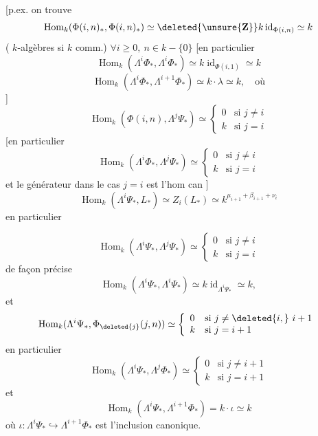 [p.ex. on trouve
\[
\operatorname{Hom}_k(\Phi(i,n)_*,\Phi(i,n)_*)
\simeq\deleted{\unsure{\mathbf Z}}k\operatorname{id}_{\Phi(i,n)}\simeq k
\]
(  
$k$-algèbres si $k$ comm.)
$\forall i\geq0,\ n\in k-\{0\}$
[en particulier
\[
\operatorname{Hom}_k(\Lambda^i\Phi_*,\Lambda^i\Phi_*)
\simeq k\operatorname{id}_{\Phi(i,1)}\simeq k
\]
\[
\operatorname{Hom}_k(\Lambda^i\Phi_*,\Lambda^{i+1}\Phi_*)
\simeq k\cdot\lambda\simeq k,\quad\text{où}
\]
]
\[
\operatorname{Hom}_k(\Phi(i,n),\Lambda^j\Psi_*)\simeq
\left\{\begin{array}{ll}0&\text{si }j\neq i\\k&\text{si }j=i\end{array}\right.
\]
[en particulier
\[
\operatorname{Hom}_k(\Lambda^i\Phi_*,\Lambda^j\Psi_*)\simeq
\left\{\begin{array}{ll}0&\text{si }j\neq i\\k&\text{si }j=i\end{array}\right.
\]
et le générateur dans le cas $j=i$ est
l'hom can
]
\[
\operatorname{Hom}_k(\Lambda^i\Psi_*,L_*)
\simeq Z_i(L_*)\simeq k^{\mu_{i+1}+\beta_{i+1}+\nu_i}
\]
en particulier

\[
\operatorname{Hom}_k(\Lambda^i\Psi_*,\Lambda^j\Psi_*)\simeq
\left\{\begin{array}{ll}0&\text{si }j\neq i\\k&\text{si }j=i\end{array}\right.
\]
de façon précise
\[
\operatorname{Hom}_k(\Lambda^i\Psi_*,\Lambda^i\Psi_*)
\simeq k\operatorname{id}_{\Lambda^i\Psi_*}\simeq k,
\]
et
\[
\operatorname{Hom}_k(\Lambda^i\Psi_*,\Phi_{\deleted{j}}(j,n))\simeq
\left\{\begin{array}{ll}
0&\text{si }j\neq\deleted{i,}\ i+1\\
k&\text{si }j=i+1
\end{array}\right.
\]
en particulier
\[
\operatorname{Hom}_k(\Lambda^i\Psi_*,\Lambda^j\Phi_*)\simeq
\left\{\begin{array}{ll}0&\text{si }j\neq i+1\\k&\text{si }j=i+1\end{array}\right.
\]
et
\[
\operatorname{Hom}_k(\Lambda^i\Psi_*,\Lambda^{i+1}\Phi_*)
=k\cdot\iota\simeq k
\]
où $\iota:\Lambda^i\Psi_*\hookrightarrow\Lambda^{i+1}\Phi_*$ est l'inclusion
canonique.


